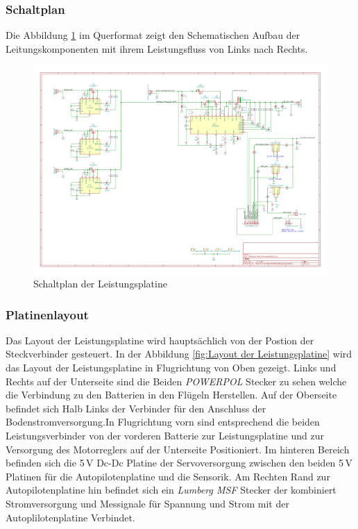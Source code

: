 \subsubsection{Schaltplan}

Die Abbildung \ref{fig:Schaltplan der Leistungsplatine} im Querformat zeigt den Schematischen Aufbau der Leitungskomponenten mit ihrem Leistungsfluss von Links nach Rechts.

\newpage

\begin{figure}[H]
\centering
\includegraphics[width=1.4\textwidth,angle =90]{bilder/Centerbox/Centerbox-Front-Power_AUVSI16.pdf} 
\caption{Schaltplan der Leistungsplatine} 
\label{fig:Schaltplan der Leistungsplatine}
\end{figure}

\subsubsection{Platinenlayout}

Das Layout der Leistungsplatine wird hauptsächlich von der Postion der Steckverbinder gesteuert.
In der Abbildung \ref{fig:Layout der Leistungsplatine} wird das Layout der Leistungsplatine in Flugrichtung von Oben gezeigt. 
Links und Rechts auf der Unterseite sind die Beiden \textit{POWERPOL} Stecker zu sehen welche die Verbindung zu den Batterien in den Flügeln Herstellen. Auf der Oberseite befindet sich Halb Links der Verbinder für den Anschluss der Bodenstromversorgung.In Flugrichtung vorn sind entsprechend die beiden Leistungsverbinder von der vorderen Batterie zur Leistungsplatine und zur Versorgung des Motorreglers auf der Unterseite Positioniert. Im hinteren Bereich befinden sich die 5\,V Dc-Dc Platine der Servoversorgung zwischen den beiden 5\,V Platinen für die Autopilotenplatine und die Sensorik.
Am Rechten Rand zur Autopilotenplatine hin befindet sich ein \textit{Lumberg MSF} Stecker der kombiniert Stromversorgung und Messignale für Spannung und Strom mit der Autoplilotenplatine Verbindet.

